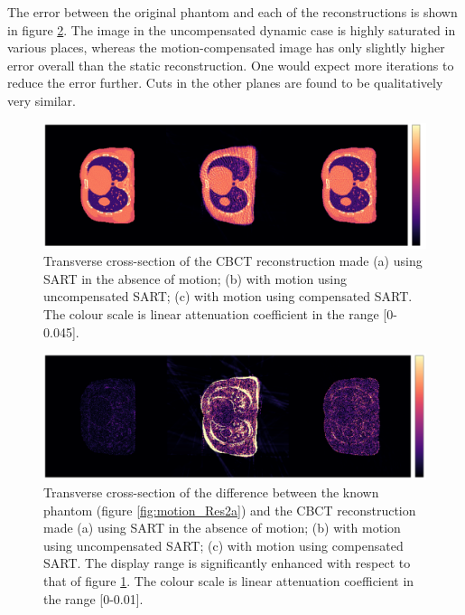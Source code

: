 The error between the original phantom and each of the reconstructions is shown in figure \ref{fig:error2}.  The image in the uncompensated dynamic case is highly saturated in various places, whereas the motion-compensated image has only slightly higher error overall than the static reconstruction.  One would expect more iterations to reduce the error further.  Cuts in the other planes are found to be qualitatively very similar.

\begin{figure}[ht]
\begin{center}
\includegraphics[width=1\linewidth]{MotionCorrection/motion2XCAT2.png}
\hspace{0.1cm}{\footnotesize (a)}\hspace{4.3cm}{\footnotesize (b)}\hspace{4.3cm}{\footnotesize (c)}
\caption[Recosntruction of SART, SART with motion and motion compensated SART]{\label{fig:result21} Transverse cross-section of the CBCT reconstruction made (a) using SART in the absence of motion; (b) with motion using uncompensated SART; (c) with motion using compensated SART. The colour scale is linear attenuation coefficient in the range [0-0.045].} 
\end{center}
\end{figure}

\begin{figure}[ht]
\begin{center}
\includegraphics[width=1\linewidth]{MotionCorrection/motion21errorXCAT2.png}
\hspace{0.1cm}{\footnotesize (a)}\hspace{4.3cm}{\footnotesize (b)}\hspace{4.3cm}{\footnotesize (c)}

\caption[Errors between the original and recosntructed image]{\label{fig:error2} Transverse cross-section of the difference between the known phantom (figure \ref{fig:motion_Res2a}) and the CBCT reconstruction made (a) using SART in the absence of motion; (b) with motion using uncompensated SART; (c) with motion using compensated SART.  The display range is significantly enhanced with respect to that of figure \ref{fig:result21}. The colour scale is linear attenuation coefficient in the range [0-0.01].} 
\end{center}
\end{figure}

